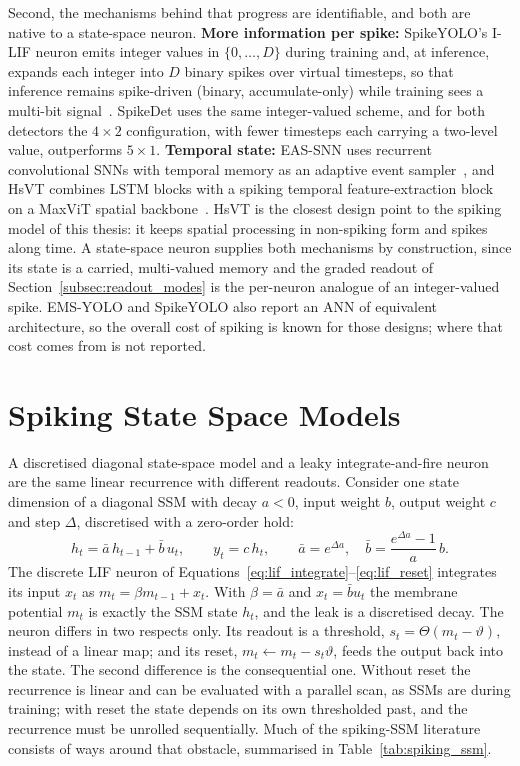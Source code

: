 \documentclass[11pt, a4paper]{report}
\begin{document}
Second, the mechanisms behind that progress are identifiable, and both are native to a state-space neuron.
\textbf{More information per spike:} SpikeYOLO's I-LIF neuron emits integer values in $\{0,\dots,D\}$ during
training and, at inference, expands each integer into $D$ binary spikes over virtual timesteps, so that
inference remains spike-driven (binary, accumulate-only) while training sees a multi-bit
signal~\cite{luo2024integer}. SpikeDet uses the same integer-valued scheme, and for both detectors the
$4\times2$ configuration, with fewer timesteps each carrying a two-level value, outperforms $5\times1$. \textbf{Temporal state:}
EAS-SNN uses recurrent convolutional SNNs with temporal memory as an adaptive event sampler~\cite{wang2024eas},
and HsVT combines LSTM blocks with a spiking temporal feature-extraction block on a MaxViT spatial
backbone~\cite{xu2025hybrid}. HsVT is the closest design point to the spiking model of this thesis: it keeps
spatial processing in non-spiking form and spikes along time. A state-space neuron supplies both mechanisms
by construction, since its state is a carried, multi-valued memory and the graded readout of
Section~\ref{subsec:readout_modes} is the per-neuron analogue of an integer-valued spike. EMS-YOLO and
SpikeYOLO also report an ANN of equivalent architecture, so the overall cost of spiking is known for those
designs; where that cost comes from is not reported.

\section{Spiking State Space Models}
\label{sec:spiking_ssm}
A discretised diagonal state-space model and a leaky integrate-and-fire neuron are the same linear
recurrence with different readouts. Consider one state dimension of a diagonal SSM with decay $a<0$,
input weight $b$, output weight $c$ and step $\Delta$, discretised with a zero-order hold:
\begin{equation}
  h_t = \bar a\, h_{t-1} + \bar b\, u_t, \qquad y_t = c\, h_t, \qquad
  \bar a = e^{\Delta a}, \quad \bar b = \frac{e^{\Delta a}-1}{a}\, b .
  \label{eq:ssm_scalar}
\end{equation}
The discrete LIF neuron of Equations~\eqref{eq:lif_integrate}--\eqref{eq:lif_reset} integrates its input
$x_t$ as $m_t = \beta m_{t-1} + x_t$. With $\beta = \bar a$ and $x_t = \bar b u_t$ the membrane potential
$m_t$ is exactly the SSM state $h_t$, and the leak is a discretised decay. The neuron differs in two
respects only. Its readout is a threshold, $s_t = \Theta(m_t - \vartheta)$, instead of a linear map; and its
reset, $m_t \leftarrow m_t - s_t\vartheta$, feeds the output back into the state. The second difference is
the consequential one. Without reset the recurrence is linear and can be evaluated with a parallel scan, as
SSMs are during training; with reset the state depends on its own thresholded past, and the recurrence must
be unrolled sequentially. Much of the spiking-SSM literature consists of ways around that obstacle,
summarised in Table~\ref{tab:spiking_ssm}.
\end{document}

